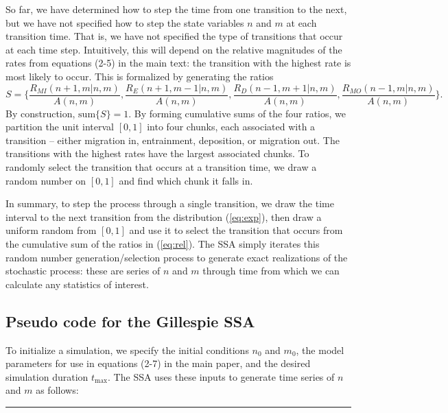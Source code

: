 \documentclass[11pt]{article}
\newcommand\be{\begin{equation}} %
\newcommand\ee{\end{equation}}   %
\begin{document}
So far, we have determined how to step the time from one transition to the next, but we have not specified how to step the state variables $n$ and $m$ at each transition time. 
That is, we have not specified the type of transitions that occur at each time step.
Intuitively, this will depend on the relative magnitudes of the rates from equations (2-5) in the main text: the transition with the highest rate is most likely to occur. This is formalized by generating the ratios
\be S = \Bigg\{\frac{R_{MI}(n+1,m|n,m)}{ A(n,m)},\frac{R_E(n+1,m-1|n,m)}{ A(n,m)},\frac{R_D(n-1,m+1|n,m)}{ A(n,m)},\frac{R_{MO}(n-1,m|n,m)}{ A(n,m)}\Bigg\}. \label{eq:rel}\ee
By construction, $\text{sum}\{S\}=1$.
By forming cumulative sums of the four ratios, we partition the unit interval $[0,1]$ into four chunks, each associated with a transition -- either migration in, entrainment, deposition, or migration out. The transitions with the highest rates have the largest associated chunks. To randomly select the transition that occurs at a transition time, we draw a random number on $[0,1]$ and find which chunk it falls in.

In summary, to step the process through a single transition, we draw the time interval to the next transition from the distribution (\ref{eq:exp}), then draw a uniform random from $[0,1]$ and use it to select the transition that occurs from the cumulative sum of the ratios in (\ref{eq:rel}). The SSA simply iterates this random number generation/selection process to generate exact realizations of the stochastic process: these are series of $n$ and $m$ through time from which we can calculate any statistics of interest.

\subsection{Pseudo code for the Gillespie SSA}

To initialize a simulation, we specify the initial conditions $n_0$ and $m_0$, the model parameters for use in equations (2-7) in the main paper, and the desired simulation duration $t_\text{max}$. The SSA uses these inputs to generate time series of $n$ and $m$ as follows:

\rule{\linewidth}{1pt}
\end{document}
